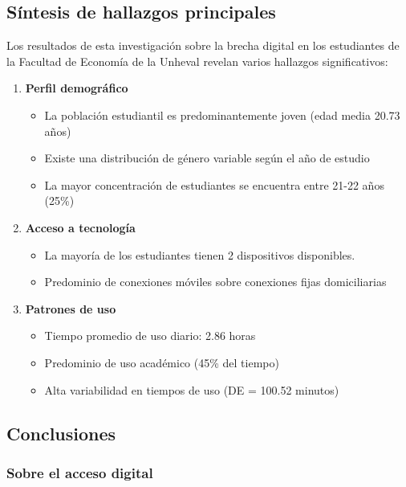 \documentclass[12pt, a4paper]{article}
\begin{document}
\subsection{Síntesis de hallazgos principales}

Los resultados de esta investigación sobre la brecha digital en los estudiantes de la Facultad de Economía de la Unheval revelan varios hallazgos significativos:

\begin{enumerate}
    \item \textbf{Perfil demográfico}
    \begin{itemize}
        \item La población estudiantil es predominantemente joven (edad media 20.73 años)
        \item Existe una distribución de género variable según el año de estudio
        \item La mayor concentración de estudiantes se encuentra entre 21-22 años (25\%)
    \end{itemize}

    \item \textbf{Acceso a tecnología}
    \begin{itemize}
        \item La mayoría de los estudiantes tienen 2 dispositivos disponibles.
        \item Predominio de conexiones móviles sobre conexiones fijas domiciliarias
    \end{itemize}

    \item \textbf{Patrones de uso}
    \begin{itemize}
        \item Tiempo promedio de uso diario: 2.86 horas
        \item Predominio de uso académico (45\% del tiempo)
        \item Alta variabilidad en tiempos de uso (DE = 100.52 minutos)
    \end{itemize}
\end{enumerate}

\subsection{Conclusiones}

\subsubsection{Sobre el acceso digital}
\end{document}
